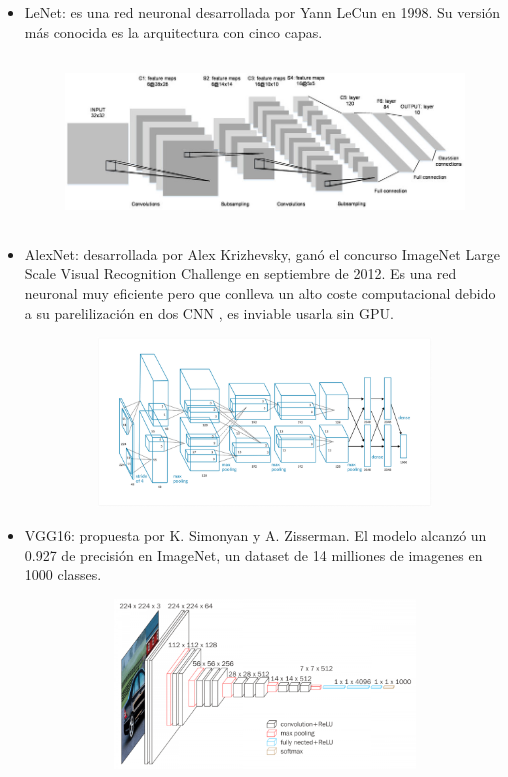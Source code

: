 \documentclass[a4paper,10pt]{article}
\begin{document}
\begin{itemize}
\item LeNet: es una red neuronal desarrollada por Yann LeCun en 1998. Su versión más conocida es la arquitectura con cinco capas. \begin{figure}[H]
\centering
\includegraphics[width=14.0cm, height=4.5cm]{lenet5.png}
\end{figure}
\item AlexNet: desarrollada por Alex Krizhevsky, ganó el concurso ImageNet Large Scale Visual Recognition Challenge en septiembre de 2012. Es una red neuronal muy eficiente pero que conlleva un alto coste computacional debido a su parelilización en dos CNN , es inviable usarla sin GPU.\begin{figure}[H]
\centering
\includegraphics[width=14.0cm, height=4.5cm]{AlexNet2012.png}
\end{figure}
\item VGG16: propuesta por K. Simonyan y A. Zisserman. El modelo alcanzó un 0.927 de precisión en ImageNet, un dataset de 14 milliones de imagenes en 1000 classes. \begin{figure}[H]
\centering
\includegraphics[width=12.0cm, height=4.5cm]{vgg16-1-e1542731207177.png}

\end{figure}
\end{itemize}
\end{document}
